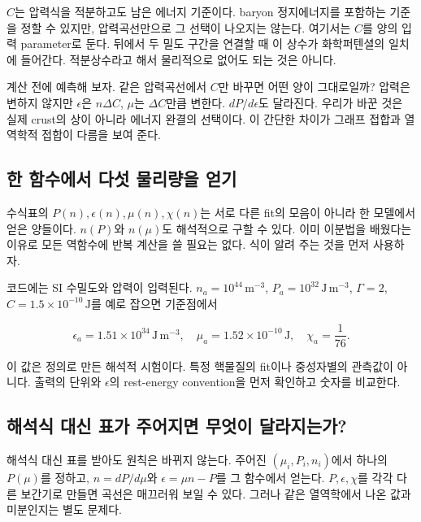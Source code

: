 \documentclass[
  10pt,
  a4paper,
]{article}
\begin{document}
\(C\)는 압력식을 적분하고도 남은 에너지 기준이다. baryon 정지에너지를
포함하는 기준을 정할 수 있지만, 압력곡선만으로 그 선택이 나오지는
않는다. 여기서는 \(C\)를 양의 입력 parameter로 둔다. 뒤에서 두 밀도
구간을 연결할 때 이 상수가 화학퍼텐셜의 일치에 들어간다. 적분상수라고
해서 물리적으로 없어도 되는 것은 아니다.

계산 전에 예측해 보자. 같은 압력곡선에서 \(C\)만 바꾸면 어떤 양이
그대로일까? 압력은 변하지 않지만 \(\epsilon\)은 \(n\Delta C\), \(\mu\)는
\(\Delta C\)만큼 변한다. \(dP/d\epsilon\)도 달라진다. 우리가 바꾼 것은
실제 crust의 상이 아니라 에너지 완결의 선택이다. 이 간단한 차이가 그래프
접합과 열역학적 접합이 다름을 보여 준다.

\subsection{한 함수에서 다섯 물리량을
얻기}\label{uxd55c-uxd568uxc218uxc5d0uxc11c-uxb2e4uxc12f-uxbb3cuxb9acuxb7c9uxc744-uxc5bbuxae30}

수식표의 \(P(n),\epsilon(n),\mu(n),\chi(n)\)는 서로 다른 fit의 모음이
아니라 한 모델에서 얻은 양들이다. \(n(P)\)와 \(n(\mu)\)도 해석적으로
구할 수 있다. 이미 이분법을 배웠다는 이유로 모든 역함수에 반복 계산을 쓸
필요는 없다. 식이 알려 주는 것을 먼저 사용하자.

코드에는 SI 수밀도와 압력이 입력된다. \(n_a=10^{44}\,\mathrm{m}^{-3}\),
\(P_a=10^{32}\,\mathrm{J\,m^{-3}}\), \(\Gamma=2\),
\(C=1.5\times10^{-10}\,\mathrm{J}\)를 예로 잡으면 기준점에서

\[
\epsilon_a=1.51\times10^{34}\,\mathrm{J\,m^{-3}},\quad
\mu_a=1.52\times10^{-10}\,\mathrm{J},\quad
\chi_a=\frac1{76}.
\]

이 값은 정의로 만든 해석적 시험이다. 특정 핵물질의 fit이나 중성자별의
관측값이 아니다. 출력의 단위와 \(\epsilon\)의 rest-energy convention을
먼저 확인하고 숫자를 비교한다.

\subsection{해석식 대신 표가 주어지면 무엇이
달라지는가?}\label{uxd574uxc11duxc2dd-uxb300uxc2e0-uxd45cuxac00-uxc8fcuxc5b4uxc9c0uxba74-uxbb34uxc5c7uxc774-uxb2ecuxb77cuxc9c0uxb294uxac00}

해석식 대신 표를 받아도 원칙은 바뀌지 않는다. 주어진
\((\mu_i,P_i,n_i)\)에서 하나의 \(P(\mu)\)를 정하고, \(n=dP/d\mu\)와
\(\epsilon=\mu n-P\)를 그 함수에서 얻는다. \(P,\epsilon,\chi\)를 각각
다른 보간기로 만들면 곡선은 매끄러워 보일 수 있다. 그러나 같은
열역학에서 나온 값과 미분인지는 별도 문제다.
\end{document}
